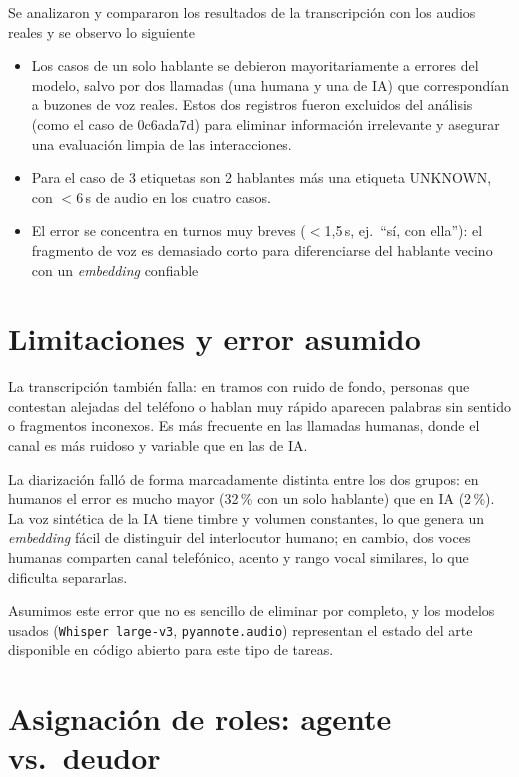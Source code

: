\documentclass[10pt,a4paper]{article}
\begin{document}
Se analizaron y compararon los resultados de la transcripción con los audios reales y se observo lo siguiente
\begin{itemize}
  \item Los casos de un solo hablante se debieron mayoritariamente a errores del modelo, salvo por dos llamadas (una humana y una de IA) que correspondían a buzones de voz reales. Estos dos registros fueron excluidos del análisis (como el caso de 0c6ada7d) 
para eliminar información irrelevante y asegurar una evaluación limpia de las interacciones.
  \item Para el caso de 3 etiquetas son 2 hablantes más una
  etiqueta UNKNOWN, con $<$6\,s de audio en los cuatro casos.
  \item El error se concentra en turnos muy breves ($<$1,5\,s, ej.\ ``sí, con ella''): el
  fragmento de voz es demasiado corto para diferenciarse del hablante vecino con un
  \textit{embedding} confiable
\end{itemize}


\section{Limitaciones y error asumido}

La transcripción también falla: en tramos con ruido de fondo, personas que contestan
alejadas del teléfono o hablan muy rápido aparecen palabras sin sentido o fragmentos
inconexos. Es más frecuente en las llamadas humanas, donde el canal es más ruidoso y
variable que en las de IA.

La diarización falló de forma marcadamente distinta entre los dos grupos: en humanos el
error es mucho mayor (32\,\% con un solo hablante) que en IA (2\,\%). La voz sintética de
la IA tiene timbre y volumen constantes, lo que genera un \textit{embedding} fácil de
distinguir del interlocutor humano; en cambio, dos voces humanas comparten canal
telefónico, acento y rango vocal similares, lo que dificulta separarlas.

Asumimos este error que no es sencillo de eliminar por completo, y los modelos usados
(\texttt{Whisper large-v3}, \texttt{pyannote.audio}) representan el estado del arte
disponible en código abierto para este tipo de tareas.
\section{Asignación de roles: agente vs.\ deudor}
\end{document}
